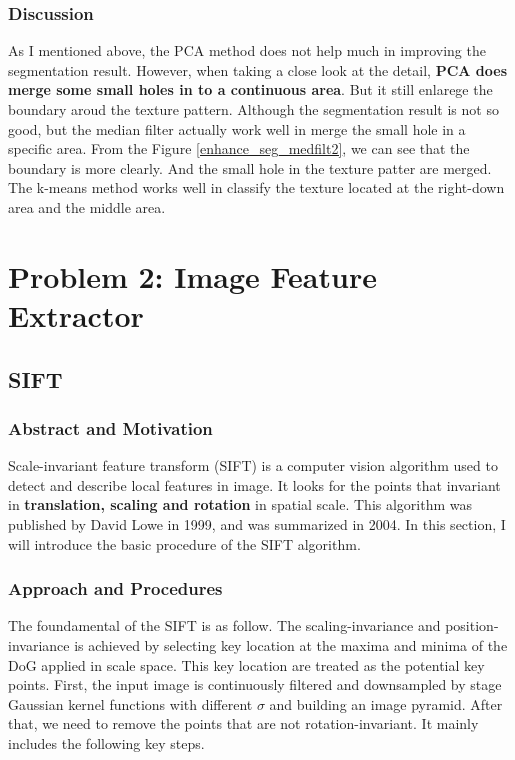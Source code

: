 \documentclass[11pt]{article}
\begin{document}
\subsubsection{Discussion}

As I mentioned above, the PCA method does not help much in improving the segmentation result. However, when taking a close look at the detail, {\bf PCA does merge some small holes in to a continuous area}. But it still enlarege the boundary aroud the texture pattern.
Although the segmentation result is not so good, but the median filter actually work well in merge the small hole in a specific area. From the Figure \ref{enhance_seg_medfilt2}, we can see that the boundary is more clearly. And the small hole in the texture patter are merged. The k-means method works well in classify the texture located at the right-down area and the middle area.
	


\section{Problem 2: Image Feature Extractor}
\subsection{SIFT}
\subsubsection{Abstract and Motivation}
Scale-invariant feature transform (SIFT) is a computer vision algorithm used to detect and describe local features in image. It looks for the points that invariant in {\bf translation, scaling and rotation} in spatial scale. This algorithm was published by David Lowe in 1999, and was summarized in 2004. In this section, I will introduce the basic procedure of the SIFT algorithm.
\subsubsection{Approach and Procedures}
The foundamental of the SIFT is as follow. The scaling-invariance and position-invariance is achieved by selecting key location at the maxima and minima of the DoG applied in scale space. This key location are treated as the potential key points. First, the input image is continuously filtered and downsampled by stage Gaussian kernel functions with different $\sigma$ and building an image pyramid. After that, we need to remove the points that are not rotation-invariant. It mainly includes the following key steps.
\end{document}
